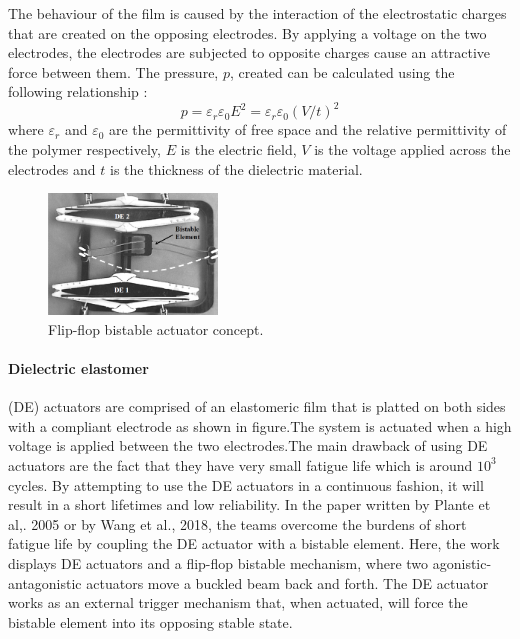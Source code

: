 The behaviour of the film is caused by the interaction of the electrostatic charges that are created on the opposing electrodes. By applying a voltage on the two electrodes, the electrodes are subjected to opposite charges cause an attractive force between them. The pressure, $p$, created can be calculated\cite{thummala_analysis_2012} using the following relationship :
\begin{equation}
	\label{eq:DEAP_p}
	p = \varepsilon_r\varepsilon_0E^2 = \varepsilon_r\varepsilon_0(V/t)^2
\end{equation}
where $\varepsilon_r$ and $\varepsilon_0$ are the permittivity of free space and the relative permittivity of the polymer respectively, $E$ is the electric field, $V$ is the voltage applied across the electrodes and $t$ is the thickness of the dielectric material.

\begin{figure}
	\centering
	\includegraphics[width=0.4\textwidth]{Figures/DEAP_flipflop.png}
	\caption{Flip-flop bistable actuator concept\cite{plante_compliant_2005}.}
	\label{fig:DEAP_flipflop}
\end{figure}
\paragraph{Dielectric elastomer} (DE) actuators are comprised of an elastomeric film that is platted on both sides with a compliant electrode as shown in figure.The system is actuated when a high voltage is applied between the two electrodes.The main drawback of using DE actuators are the fact that they have very small fatigue life which is around $10^3$ cycles\cite{chen_preliminary_2017}. By attempting to use the DE actuators in a continuous fashion, it will result in a short lifetimes and low reliability. In the paper written by Plante et al,. 2005\cite{plante_properties_2007,chouinard_bistable_2012} or by Wang et al., 2018\cite{wang_design_2018}, the teams overcome the burdens of short fatigue life by coupling the DE actuator with a bistable element. Here, the work displays DE actuators and a flip-flop bistable mechanism, where two agonistic-antagonistic actuators move a buckled beam back and forth. The DE actuator works as an external trigger mechanism that, when actuated, will force the bistable element into its opposing stable state.

